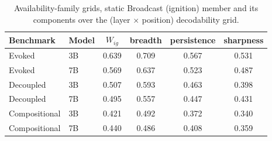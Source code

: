 \begin{table}[h]
\centering
\caption{Availability-family grids, static Broadcast (ignition) member and its
components over the (layer $\times$ position) decodability grid.}
\label{tab:appA7b}
\small
\begin{tabular}{ll>{\columncolor{wsRow}}cccc}
\toprule
Benchmark & Model & $W_{ig}$ & breadth & persistence & sharpness \\
\midrule
Evoked & 3B & 0.639 & 0.709 & 0.567 & 0.531 \\
Evoked & 7B & 0.569 & 0.637 & 0.523 & 0.487 \\
Decoupled & 3B & 0.507 & 0.593 & 0.463 & 0.398 \\
Decoupled & 7B & 0.495 & 0.557 & 0.447 & 0.431 \\
Compositional & 3B & 0.421 & 0.492 & 0.372 & 0.340 \\
Compositional & 7B & 0.440 & 0.486 & 0.408 & 0.359 \\
\bottomrule
\end{tabular}
\end{table}
